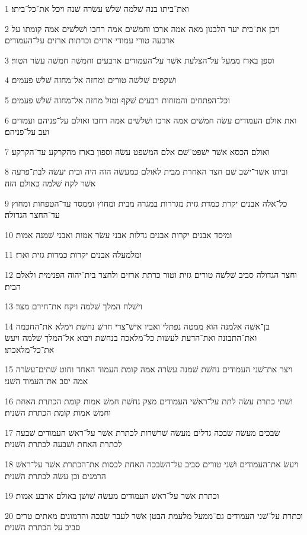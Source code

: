 \par 1 ואת־ביתו בנה שׁלמה שׁלשׁ עשׂרה שׁנה ויכל את־כל־ביתו׃
\par 2 ויבן את־בית יער הלבנון מאה אמה ארכו וחמשׁים אמה רחבו ושׁלשׁים אמה קומתו על ארבעה טורי עמודי ארזים וכרתות ארזים על־העמודים׃
\par 3 וספן בארז ממעל על־הצלעת אשׁר על־העמודים ארבעים וחמשׁה חמשׁה עשׂר הטור׃
\par 4 ושׁקפים שׁלשׁה טורים ומחזה אל־מחזה שׁלשׁ פעמים׃
\par 5 וכל־הפתחים והמזוזות רבעים שׁקף ומול מחזה אל־מחזה שׁלשׁ פעמים׃
\par 6 ואת אולם העמודים עשׂה חמשׁים אמה ארכו ושׁלשׁים אמה רחבו ואולם על־פניהם ועמדים ועב על־פניהם׃
\par 7 ואולם הכסא אשׁר ישׁפט־שׁם אלם המשׁפט עשׂה וספון בארז מהקרקע עד־הקרקע׃
\par 8 וביתו אשׁר־ישׁב שׁם חצר האחרת מבית לאולם כמעשׂה הזה היה ובית יעשׂה לבת־פרעה אשׁר לקח שׁלמה כאולם הזה׃
\par 9 כל־אלה אבנים יקרת כמדת גזית מגררות במגרה מבית ומחוץ וממסד עד־הטפחות ומחוץ עד־החצר הגדולה׃
\par 10 ומיסד אבנים יקרות אבנים גדלות אבני עשׂר אמות ואבני שׁמנה אמות׃
\par 11 ומלמעלה אבנים יקרות כמדות גזית וארז׃
\par 12 וחצר הגדולה סביב שׁלשׁה טורים גזית וטור כרתת ארזים ולחצר בית־יהוה הפנימית ולאלם הבית׃
\par 13 וישׁלח המלך שׁלמה ויקח את־חירם מצר׃
\par 14 בן־אשׁה אלמנה הוא ממטה נפתלי ואביו אישׁ־צרי חרשׁ נחשׁת וימלא את־החכמה ואת־התבונה ואת־הדעת לעשׂות כל־מלאכה בנחשׁת ויבוא אל־המלך שׁלמה ויעשׂ את־כל־מלאכתו׃
\par 15 ויצר את־שׁני העמודים נחשׁת שׁמנה עשׂרה אמה קומת העמוד האחד וחוט שׁתים־עשׂרה אמה יסב את־העמוד השׁני׃
\par 16 ושׁתי כתרת עשׂה לתת על־ראשׁי העמודים מצק נחשׁת חמשׁ אמות קומת הכתרת האחת וחמשׁ אמות קומת הכתרת השׁנית׃
\par 17 שׂבכים מעשׂה שׂבכה גדלים מעשׂה שׁרשׁרות לכתרת אשׁר על־ראשׁ העמודים שׁבעה לכתרת האחת ושׁבעה לכתרת השׁנית׃
\par 18 ויעשׂ את־העמודים ושׁני טורים סביב על־השׂבכה האחת לכסות את־הכתרת אשׁר על־ראשׁ הרמנים וכן עשׂה לכתרת השׁנית׃
\par 19 וכתרת אשׁר על־ראשׁ העמודים מעשׂה שׁושׁן באולם ארבע אמות׃
\par 20 וכתרת על־שׁני העמודים גם־ממעל מלעמת הבטן אשׁר לעבר שׂבכה והרמונים מאתים טרים סביב על הכתרת השׁנית׃
